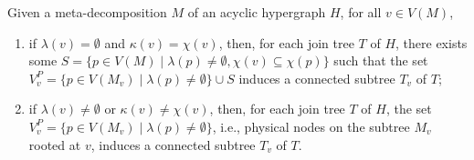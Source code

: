 \begin{lemma} \label{lem:subtree-in-jt}
    Given a meta-decomposition $M$ of an acyclic hypergraph $H$, for all $v \in V(M)$,
    \begin{enumerate}[leftmargin=*]
        \item if $\lambda(v) = \emptyset$ and $\kappa(v) = \chi(v)$, then, for each join tree $T$ of $H$, there exists some $S = \{ p \in V(M) \mid \lambda(p) \neq \emptyset, \chi(v) \subseteq \chi(p) \}$ such that the set $V_v^P = \{ p \in V(M_{v}) \mid \lambda(p) \neq \emptyset \} \cup S$ induces a connected subtree $T_v$ of $T$;
        \item if $\lambda(v) \neq \emptyset$ or $\kappa(v) \neq \chi(v)$, then, for each join tree $T$ of $H$, the set $V_v^P = \{ p \in V(M_v) \mid \lambda(p)  \neq \emptyset \}$, i.e., physical nodes on the subtree $M_v$ rooted at $v$, induces a connected subtree $T_v$ of $T$.
    \end{enumerate}
\end{lemma}



